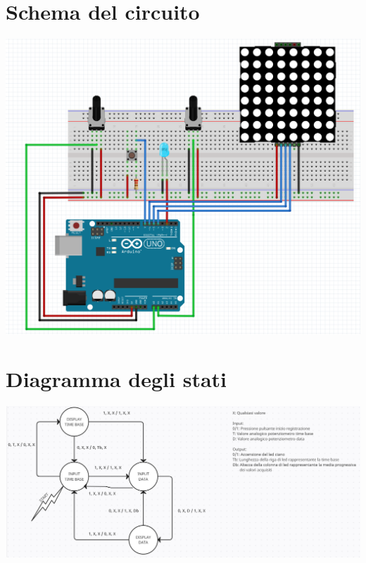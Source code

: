 \documentclass{article}
\begin{document}
\section{Schema del circuito}
\includegraphics[scale=.4]{progettoFritzing.png}

\section{Diagramma degli stati}
\includegraphics[scale=.2]{diagrammaStati.png}
\end{document}

